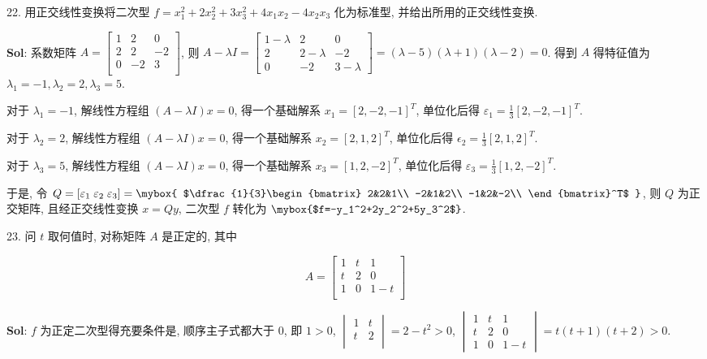 

22. 用正交线性变换将二次型 $f=x_1^2+2x_2^2+3x_3^2+4x_1x_2-4x_2x_3$ 化为标准型, 并给出所用的正交线性变换.

\textbf{Sol}: 系数矩阵 $A=\begin{bmatrix}
    1&2&0\\
    2&2&-2\\
    0&-2&3\\
\end{bmatrix}$, 则 $A-\lambda I=\begin{bmatrix}
    1-\lambda&2&0\\
    2&2-\lambda&-2\\
    0&-2&3-\lambda
\end{bmatrix}=(\lambda-5)(\lambda+1)(\lambda-2)=0$. 得到 $A$ 得特征值为 $\lambda_1=-1,\lambda_2=2,\lambda_3=5$.

对于 $\lambda_1=-1$, 解线性方程组 $(A-\lambda I)x=0$, 得一个基础解系 $x_1=[2,-2,-1]^T$, 单位化后得 $\varepsilon_1=\frac{1}{3}[2,-2,-1]^T$.

对于 $\lambda_2=2$, 解线性方程组 $(A-\lambda I)x=0$, 得一个基础解系 $x_2=[2,1,2]^T$, 单位化后得 $\epsilon_2=\frac{1}{3}[2,1,2]^T$.

对于 $\lambda_3=5$, 解线性方程组 $(A-\lambda I)x=0$, 得一个基础解系 $x_3=[1,2,-2]^T$, 单位化后得 $\varepsilon_3=\frac{1}{3}[1,2,-2]^T$.

于是, 令 $Q=[\varepsilon_1\;\varepsilon_2\;\varepsilon_3]
=\mybox{
$\dfrac{1}{3}\begin{bmatrix}
    2&2&1\\
    -2&1&2\\
    -1&2&-2\\
\end{bmatrix}^T$
}$, 则 $Q$ 为正交矩阵, 
且经正交线性变换 $x=Qy$, 二次型 $f$ 转化为 $\mybox{$f=-y_1^2+2y_2^2+5y_3^2$}$.

\vspace{12pt}

23. 问 $t$ 取何值时, 对称矩阵 $A$ 是正定的, 其中 

$$
A=
\begin{bmatrix}
    1&t&1\\
    t&2&0\\
    1&0&1-t\\
\end{bmatrix}
$$

\textbf{Sol}: $f$ 为正定二次型得充要条件是, 顺序主子式都大于 0, 即 $1>0$, $\begin{vmatrix}1&t\\t&2\\\end{vmatrix}=2-t^2>0$, $\begin{vmatrix}
    1&t&1\\
    t&2&0\\
    1&0&1-t
\end{vmatrix}=t(t+1)(t+2)>0$. 

